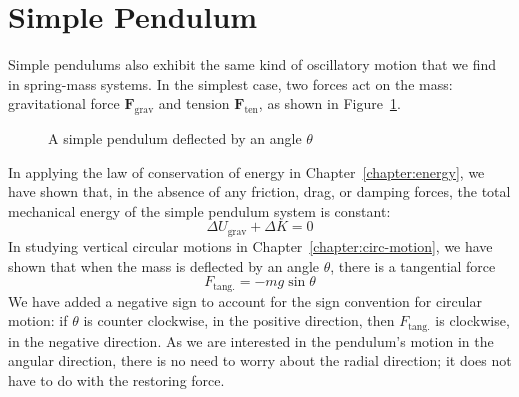 \section{Simple Pendulum}
Simple pendulums also exhibit the same kind of oscillatory motion that we find
in spring-mass systems. In the simplest case, two forces act on the mass:
gravitational force $\bm F_\text{grav}$ and tension $\bm F_\text{ten}$, as shown
in Figure~\ref{fig:pendulum1}.
\begin{figure}[ht]
  \centering 
  \caption{A simple pendulum deflected by an angle $\theta$}
  \label{fig:pendulum1}
\end{figure}

In applying the law of conservation of energy in Chapter~\ref{chapter:energy},
we have shown that, in the absence of any friction, drag, or damping forces,
the total mechanical energy of the simple pendulum system is constant:
\begin{equation*}
  \Delta U_\text{grav} + \Delta K = 0
\end{equation*}
In studying vertical circular motions in Chapter~\ref{chapter:circ-motion}, we
have shown that when the mass is deflected by an angle $\theta$, there is a
tangential force
\begin{equation*}
  F_\text{tang.}=-mg\sin\theta
\end{equation*}
We have added a negative sign to account for the sign convention for circular
motion: if $\theta$ is counter clockwise, in the positive direction, then
$F_\text{tang.}$ is clockwise, in the negative direction.  As we are
interested in the pendulum's motion in the angular direction, there is no need
to worry about the radial direction; it does not have to do with the restoring
force.

